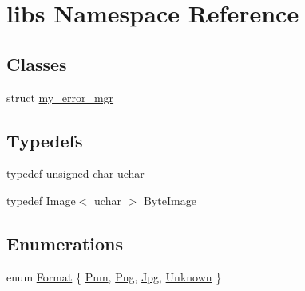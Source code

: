 \hypertarget{namespacelibs}{}\section{libs Namespace Reference}
\label{namespacelibs}
\subsection*{Classes}
\begin{DoxyCompactItemize}
\item 
struct \hyperlink{structlibs_1_1my__error__mgr}{my\+\_\+error\+\_\+mgr}
\end{DoxyCompactItemize}
\subsection*{Typedefs}
\begin{DoxyCompactItemize}
\item 
typedef unsigned char \hyperlink{namespacelibs_a90e2a46b7e02c762706ee6be80091c7a}{uchar}
\item 
typedef \hyperlink{classImage}{Image}$<$ \hyperlink{namespacelibs_a90e2a46b7e02c762706ee6be80091c7a}{uchar} $>$ \hyperlink{namespacelibs_a16118b81f5f0fc54cea32159a5530299}{Byte\+Image}
\end{DoxyCompactItemize}
\subsection*{Enumerations}
\begin{DoxyCompactItemize}
\item 
enum \hyperlink{namespacelibs_a85e30cf7dbcb94a3d5e3bd5caf31c752}{Format} \{ \hyperlink{namespacelibs_a85e30cf7dbcb94a3d5e3bd5caf31c752a3b3feebbfff158c46cb1a815c2a03d65}{Pnm}, 
\hyperlink{namespacelibs_a85e30cf7dbcb94a3d5e3bd5caf31c752ae5e58ecfb1afb18e0f4ad9fbbb15e7b3}{Png}, 
\hyperlink{namespacelibs_a85e30cf7dbcb94a3d5e3bd5caf31c752a1c4e75b56624380b0bae2dfa46ade686}{Jpg}, 
\hyperlink{namespacelibs_a85e30cf7dbcb94a3d5e3bd5caf31c752a457d8e698dc3640a6be5692ea8e920c8}{Unknown}
 \}
\end{DoxyCompactItemize}
